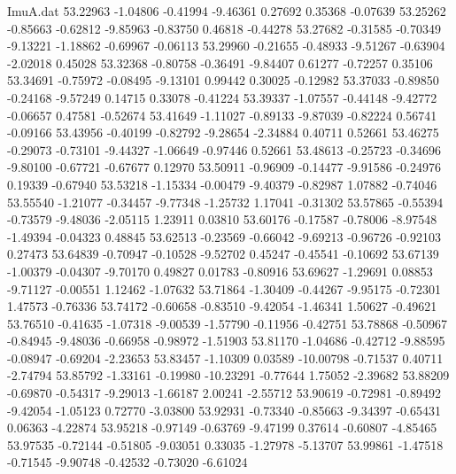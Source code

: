\begin{filecontents}{ImuA.dat}
  53.22963   -1.04806   -0.41994   -9.46361    0.27692    0.35368   -0.07639
  53.25262   -0.85663   -0.62812   -9.85963   -0.83750    0.46818   -0.44278
  53.27682   -0.31585   -0.70349   -9.13221   -1.18862   -0.69967   -0.06113
  53.29960   -0.21655   -0.48933   -9.51267   -0.63904   -2.02018    0.45028
  53.32368   -0.80758   -0.36491   -9.84407    0.61277   -0.72257    0.35106
  53.34691   -0.75972   -0.08495   -9.13101    0.99442    0.30025   -0.12982
  53.37033   -0.89850   -0.24168   -9.57249    0.14715    0.33078   -0.41224
  53.39337   -1.07557   -0.44148   -9.42772   -0.06657    0.47581   -0.52674
  53.41649   -1.11027   -0.89133   -9.87039   -0.82224    0.56741   -0.09166
  53.43956   -0.40199   -0.82792   -9.28654   -2.34884    0.40711    0.52661
  53.46275   -0.29073   -0.73101   -9.44327   -1.06649   -0.97446    0.52661
  53.48613   -0.25723   -0.34696   -9.80100   -0.67721   -0.67677    0.12970
  53.50911   -0.96909   -0.14477   -9.91586   -0.24976    0.19339   -0.67940
  53.53218   -1.15334   -0.00479   -9.40379   -0.82987    1.07882   -0.74046
  53.55540   -1.21077   -0.34457   -9.77348   -1.25732    1.17041   -0.31302
  53.57865   -0.55394   -0.73579   -9.48036   -2.05115    1.23911    0.03810
  53.60176   -0.17587   -0.78006   -8.97548   -1.49394   -0.04323    0.48845
  53.62513   -0.23569   -0.66042   -9.69213   -0.96726   -0.92103    0.27473
  53.64839   -0.70947   -0.10528   -9.52702    0.45247   -0.45541   -0.10692
  53.67139   -1.00379   -0.04307   -9.70170    0.49827    0.01783   -0.80916
  53.69627   -1.29691    0.08853   -9.71127   -0.00551    1.12462   -1.07632
  53.71864   -1.30409   -0.44267   -9.95175   -0.72301    1.47573   -0.76336
  53.74172   -0.60658   -0.83510   -9.42054   -1.46341    1.50627   -0.49621
  53.76510   -0.41635   -1.07318   -9.00539   -1.57790   -0.11956   -0.42751
  53.78868   -0.50967   -0.84945   -9.48036   -0.66958   -0.98972   -1.51903
  53.81170   -1.04686   -0.42712   -9.88595   -0.08947   -0.69204   -2.23653
  53.83457   -1.10309    0.03589  -10.00798   -0.71537    0.40711   -2.74794
  53.85792   -1.33161   -0.19980  -10.23291   -0.77644    1.75052   -2.39682
  53.88209   -0.69870   -0.54317   -9.29013   -1.66187    2.00241   -2.55712
  53.90619   -0.72981   -0.89492   -9.42054   -1.05123    0.72770   -3.03800
  53.92931   -0.73340   -0.85663   -9.34397   -0.65431    0.06363   -4.22874
  53.95218   -0.97149   -0.63769   -9.47199    0.37614   -0.60807   -4.85465
  53.97535   -0.72144   -0.51805   -9.03051    0.33035   -1.27978   -5.13707
  53.99861   -1.47518   -0.71545   -9.90748   -0.42532   -0.73020   -6.61024

\end{filecontents}
